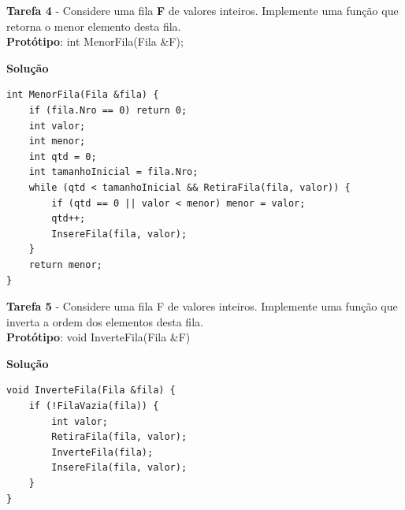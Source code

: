 \documentclass{article}
\begin{document}
\bigskip

\par
\noindent
\textbf{Tarefa 4} -  Considere uma fila \textbf{F} de valores inteiros. Implemente uma função que retorna o menor elemento desta fila.\\
\textbf{Protótipo}: int MenorFila(Fila \&F);
\bigskip
\par
\noindent
\textbf{Solução}
\begin{lstlisting}
int MenorFila(Fila &fila) {
    if (fila.Nro == 0) return 0;
    int valor;
    int menor;
    int qtd = 0;
    int tamanhoInicial = fila.Nro;
    while (qtd < tamanhoInicial && RetiraFila(fila, valor)) {
        if (qtd == 0 || valor < menor) menor = valor;
        qtd++;
        InsereFila(fila, valor);
    }
    return menor;
}
\end{lstlisting}

\bigskip

\par
\noindent
\textbf{Tarefa 5} - Considere uma fila F de valores inteiros. Implemente uma função que inverta a ordem dos elementos desta fila.\\
\textbf{Protótipo}: void InverteFila(Fila \&F)
\bigskip
\par
\noindent
\textbf{Solução}
\begin{lstlisting}
void InverteFila(Fila &fila) {
    if (!FilaVazia(fila)) {
        int valor;
        RetiraFila(fila, valor);
        InverteFila(fila);
        InsereFila(fila, valor);
    }
}
\end{lstlisting}
\end{document}
